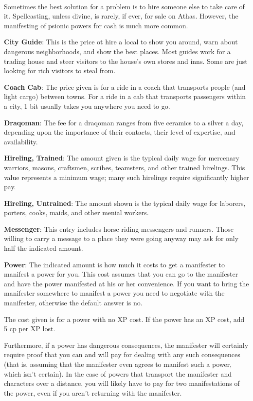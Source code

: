 {\\
}

Sometimes the best solution for a problem is to hire someone else to take care of it. Spellcasting, unless divine, is rarely, if ever, for sale on Athas. However, the manifesting of psionic powers for cash is much more common.

\textbf{City Guide}: This is the price ot hire a local to show you around, warn about dangerous neighborhoods, and show the best places. Most guides work for a trading house and steer visitors to the house's own stores and inns. Some are just looking for rich visitors to steal from.

\textbf{Coach Cab}: The price given is for a ride in a coach that transports people (and light cargo) between towns. For a ride in a cab that transports passengers within a city, 1 bit usually takes you anywhere you need to go.

\textbf{Draqoman}: The fee for a draqoman ranges from five ceramics to a silver a day, depending upon the importance of their contacts, their level of expertise, and availability.

\textbf{Hireling, Trained}: The amount given is the typical daily wage for mercenary warriors, masons, craftsmen, scribes, teamsters, and other trained hirelings. This value represents a minimum wage; many such hirelings require significantly higher pay.

\textbf{Hireling, Untrained}: The amount shown is the typical daily wage for laborers, porters, cooks, maids, and other menial workers.

\textbf{Messenger}: This entry includes horse-riding messengers and runners. Those willing to carry a message to a place they were going anyway may ask for only half the indicated amount.

\textbf{Power}: The indicated amount is how much it costs to get a manifester to manifest a power for you. This cost assumes that you can go to the manifester and have the power manifested at his or her convenience. If you want to bring the manifester somewhere to manifest a power you need to negotiate with the manifester, otherwise the default answer is no.

The cost given is for a power with no XP cost. If the power has an XP cost, add 5 cp per XP lost.

Furthermore, if a power has dangerous consequences, the manifester will certainly require proof that you can and will pay for dealing with any such consequences (that is, assuming that the manifester even agrees to manifest such a power, which isn't certain). In the case of powers that transport the manifester and characters over a distance, you will likely have to pay for two manifestations of the power, even if you aren't returning with the manifester.

